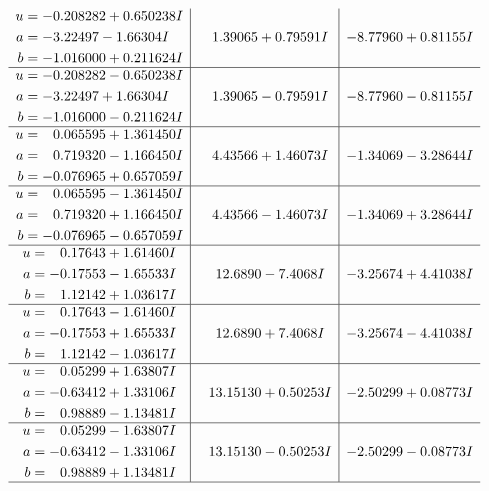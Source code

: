\documentclass[1p]{elsarticle_modified}
\theoremstyle{definition}
\begin{document}
$$\begin{array}{c|c|c}
\begin{aligned}
u &= -0.208282 + 0.650238 I \\
a &= -3.22497 - 1.66304 I \\
b &= -1.016000 + 0.211624 I\end{aligned}
 & \phantom{-}1.39065 + 0.79591 I & -8.77960 + 0.81155 I \\ \hline\begin{aligned}
u &= -0.208282 - 0.650238 I \\
a &= -3.22497 + 1.66304 I \\
b &= -1.016000 - 0.211624 I\end{aligned}
 & \phantom{-}1.39065 - 0.79591 I & -8.77960 - 0.81155 I \\ \hline\begin{aligned}
u &= \phantom{-}0.065595 + 1.361450 I \\
a &= \phantom{-}0.719320 - 1.166450 I \\
b &= -0.076965 + 0.657059 I\end{aligned}
 & \phantom{-}4.43566 + 1.46073 I & -1.34069 - 3.28644 I \\ \hline\begin{aligned}
u &= \phantom{-}0.065595 - 1.361450 I \\
a &= \phantom{-}0.719320 + 1.166450 I \\
b &= -0.076965 - 0.657059 I\end{aligned}
 & \phantom{-}4.43566 - 1.46073 I & -1.34069 + 3.28644 I \\ \hline\begin{aligned}
u &= \phantom{-}0.17643 + 1.61460 I \\
a &= -0.17553 - 1.65533 I \\
b &= \phantom{-}1.12142 + 1.03617 I\end{aligned}
 & \phantom{-}12.6890 - 7.4068 I & -3.25674 + 4.41038 I \\ \hline\begin{aligned}
u &= \phantom{-}0.17643 - 1.61460 I \\
a &= -0.17553 + 1.65533 I \\
b &= \phantom{-}1.12142 - 1.03617 I\end{aligned}
 & \phantom{-}12.6890 + 7.4068 I & -3.25674 - 4.41038 I \\ \hline\begin{aligned}
u &= \phantom{-}0.05299 + 1.63807 I \\
a &= -0.63412 + 1.33106 I \\
b &= \phantom{-}0.98889 - 1.13481 I\end{aligned}
 & \phantom{-}13.15130 + 0.50253 I & -2.50299 + 0.08773 I \\ \hline\begin{aligned}
u &= \phantom{-}0.05299 - 1.63807 I \\
a &= -0.63412 - 1.33106 I \\
b &= \phantom{-}0.98889 + 1.13481 I\end{aligned}
 & \phantom{-}13.15130 - 0.50253 I & -2.50299 - 0.08773 I\\
 \hline 
 \end{array}$$\newpage\newpage\renewcommand{\arraystretch}{1}
\end{document}
